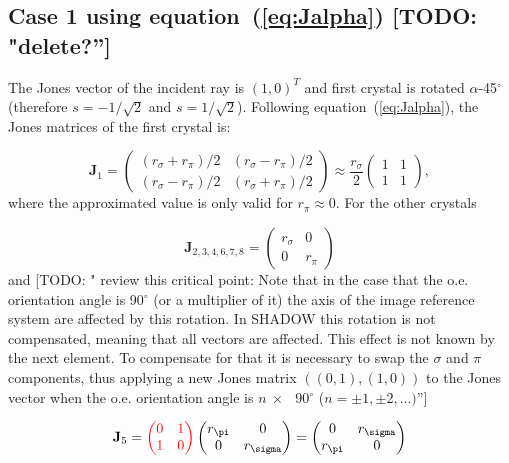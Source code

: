 \documentclass{iucr}
\newcommand{\todo}[1]{{\color{red}[TODO: "#1'']}}
\newcommand{\inred}[1]{{\color{red}#1}}
\begin{document}
\subsection{Case 1 using equation~(\ref{eq:Jalpha}) \todo{delete?}}
The Jones vector of the incident ray is $(1,0)^T$ and first crystal is rotated $\alpha$-45$^\circ$ (therefore $s=-1/\sqrt{2}$ and $s=1/\sqrt{2}$). Following equation~(\ref{eq:Jalpha}), the Jones matrices of the first crystal is: 

\begin{equation}\label{eq:Jcase1_xtal1}
    \textbf{J}_1=
    \begin{pmatrix}
(r_\sigma + r_\pi) / 2 &
(r_\sigma - r_\pi) / 2\\
(r_\sigma - r_\pi) / 2& 
(r_\sigma + r_\pi) / 2
\end{pmatrix} \approx
    \frac{r_\sigma}{2}\begin{pmatrix}
1 & 1 \\
1 & 1
\end{pmatrix} 
,
\end{equation}
where the approximated value is only valid for $r_\pi \approx 0$. For the other crystals

\begin{equation}\label{eq:Jcase1}
\textbf{J}_{2,3,4,6,7,8}=
    \begin{pmatrix}
r_\sigma & 0\\
0& 
r_\pi
\end{pmatrix}
\end{equation}
and
    \todo{ review this critical point:  Note that in the case that the o.e. orientation angle is 90$^\circ$ (or a multiplier of it) the axis of the image reference system are affected by this rotation. In SHADOW this rotation is not compensated, meaning that all vectors are affected. This effect is not known by the next element. To compensate for that it is necessary to swap the $\sigma$ and $\pi$ components, thus applying a new Jones matrix $((0,1),(1,0))$ to the Jones vector when the o.e. orientation angle is $n~\times~$~90$^\circ$ ($n=\pm 1, \pm 2, ...)$}
    
\begin{equation}\label{eq:J5case1}
\textbf{J}_{5}=
\inred{
\begin{pmatrix}
0 & 1\\
1 & 0
\end{pmatrix}
}
\begin{pmatrix}
r_\pi & 0\\
0& 
r_\sigma
\end{pmatrix}
=
\begin{pmatrix}
0 & r_\sigma\\
r_\pi& 
0
\end{pmatrix}
\end{equation}
\end{document}
